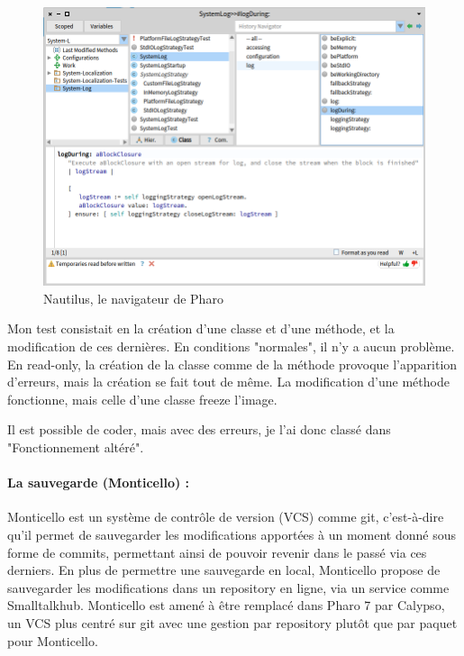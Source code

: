 \begin{figure}[h]
	\includegraphics[width=\linewidth]{./img/nautilus.png}
	\caption[nautilus]{Nautilus, le navigateur de Pharo}
\end{figure}

Mon test consistait en la création d'une classe et d'une méthode, et la modification de ces dernières. En conditions "normales", il n'y a aucun problème. En read-only, la création de la classe comme de la méthode provoque l'apparition d'erreurs, mais la création se fait tout de même. La modification d'une méthode fonctionne, mais celle d'une classe freeze l'image.

Il est possible de coder, mais avec des erreurs, je l'ai donc classé dans "Fonctionnement altéré".

\paragraph{La sauvegarde (Monticello) :}
Monticello est un système de contrôle de version (VCS) comme git, c'est-à-dire qu'il permet de sauvegarder les modifications apportées à un moment donné sous forme de commits, permettant ainsi de pouvoir revenir dans le passé via ces derniers. En plus de permettre une sauvegarde en local, Monticello propose de sauvegarder les modifications dans un repository en ligne, via un service comme Smalltalkhub. Monticello est amené à être remplacé dans Pharo 7 par Calypso, un VCS plus centré sur git avec une gestion par repository plutôt que par paquet pour Monticello.

